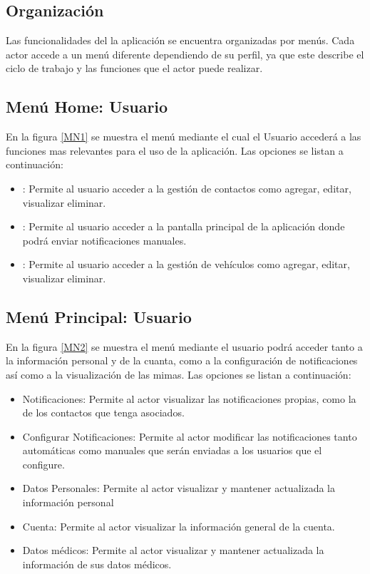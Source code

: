 
\subsection{Organización}
Las funcionalidades del la aplicación se encuentra organizadas por menús. Cada actor accede a un menú diferente dependiendo de su perfil, ya que este describe el ciclo de trabajo y las funciones que el actor puede realizar.


\hypertarget{menu:Usuario}{}	
\subsection{Menú Home: Usuario}
En la figura \ref{MN1} se muestra el menú mediante el cual el Usuario accederá a las funciones mas relevantes para el uso de la aplicación. Las opciones se listan a continuación:

\begin{itemize}
	\item {} : Permite al usuario acceder a la gestión de contactos como agregar, editar, visualizar eliminar.
	\item \btnHome [Home] : Permite al usuario acceder a la pantalla principal de la aplicación donde podrá enviar notificaciones manuales.
	\item {} : Permite al usuario acceder a la gestión de vehículos como agregar, editar, visualizar eliminar.
\end{itemize}


\pagebreak

\hypertarget{menu:UsuarioP}{}	
\subsection{Menú Principal: Usuario}
En la figura \ref{MN2} se muestra el menú mediante el usuario podrá acceder tanto a la información personal y de la cuanta, como a la configuración de notificaciones así como a la visualización de las mimas. Las opciones se listan a continuación:

\begin{itemize}
	\item Notificaciones: Permite al actor visualizar las notificaciones propias, como la de los contactos que tenga asociados.
	\item Configurar Notificaciones: Permite al actor modificar las notificaciones tanto automáticas como manuales que serán enviadas a los usuarios que el configure.
	\item Datos Personales: Permite al actor visualizar y mantener actualizada la información personal 
	\item Cuenta: Permite al actor visualizar la información general de la cuenta.
	\item Datos médicos: Permite al actor visualizar y mantener actualizada la información de sus datos médicos.
\end{itemize}


\pagebreak